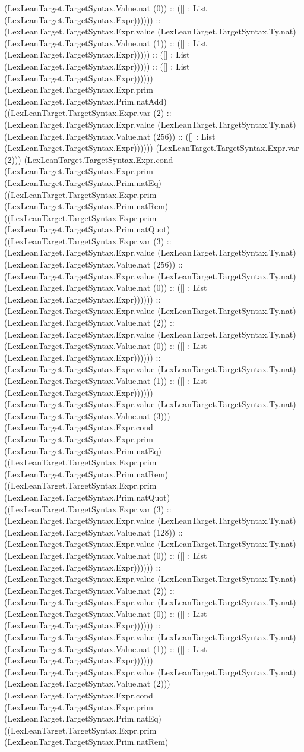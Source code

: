 \documentclass[11pt]{article}
\begin{document}
(LexLeanTarget.TargetSyntax.Value.nat (0)) :: ([] : List (LexLeanTarget.TargetSyntax.Expr)))))) :: (LexLeanTarget.TargetSyntax.Expr.value (LexLeanTarget.TargetSyntax.Ty.nat) (LexLeanTarget.TargetSyntax.Value.nat (1)) :: ([] : List (LexLeanTarget.TargetSyntax.Expr))))) :: ([] : List (LexLeanTarget.TargetSyntax.Expr))))) :: ([] : List (LexLeanTarget.TargetSyntax.Expr)))))) (LexLeanTarget.TargetSyntax.Expr.prim (LexLeanTarget.TargetSyntax.Prim.natAdd) ((LexLeanTarget.TargetSyntax.Expr.var (2) :: (LexLeanTarget.TargetSyntax.Expr.value (LexLeanTarget.TargetSyntax.Ty.nat) (LexLeanTarget.TargetSyntax.Value.nat (256)) :: ([] : List (LexLeanTarget.TargetSyntax.Expr)))))) (LexLeanTarget.TargetSyntax.Expr.var (2))) (LexLeanTarget.TargetSyntax.Expr.cond (LexLeanTarget.TargetSyntax.Expr.prim (LexLeanTarget.TargetSyntax.Prim.natEq) ((LexLeanTarget.TargetSyntax.Expr.prim (LexLeanTarget.TargetSyntax.Prim.natRem) ((LexLeanTarget.TargetSyntax.Expr.prim (LexLeanTarget.TargetSyntax.Prim.natQuot) ((LexLeanTarget.TargetSyntax.Expr.var (3) :: (LexLeanTarget.TargetSyntax.Expr.value (LexLeanTarget.TargetSyntax.Ty.nat) (LexLeanTarget.TargetSyntax.Value.nat (256)) :: (LexLeanTarget.TargetSyntax.Expr.value (LexLeanTarget.TargetSyntax.Ty.nat) (LexLeanTarget.TargetSyntax.Value.nat (0)) :: ([] : List (LexLeanTarget.TargetSyntax.Expr)))))) :: (LexLeanTarget.TargetSyntax.Expr.value (LexLeanTarget.TargetSyntax.Ty.nat) (LexLeanTarget.TargetSyntax.Value.nat (2)) :: (LexLeanTarget.TargetSyntax.Expr.value (LexLeanTarget.TargetSyntax.Ty.nat) (LexLeanTarget.TargetSyntax.Value.nat (0)) :: ([] : List (LexLeanTarget.TargetSyntax.Expr)))))) :: (LexLeanTarget.TargetSyntax.Expr.value (LexLeanTarget.TargetSyntax.Ty.nat) (LexLeanTarget.TargetSyntax.Value.nat (1)) :: ([] : List (LexLeanTarget.TargetSyntax.Expr)))))) (LexLeanTarget.TargetSyntax.Expr.value (LexLeanTarget.TargetSyntax.Ty.nat) (LexLeanTarget.TargetSyntax.Value.nat (3))) (LexLeanTarget.TargetSyntax.Expr.cond (LexLeanTarget.TargetSyntax.Expr.prim (LexLeanTarget.TargetSyntax.Prim.natEq) ((LexLeanTarget.TargetSyntax.Expr.prim (LexLeanTarget.TargetSyntax.Prim.natRem) ((LexLeanTarget.TargetSyntax.Expr.prim (LexLeanTarget.TargetSyntax.Prim.natQuot) ((LexLeanTarget.TargetSyntax.Expr.var (3) :: (LexLeanTarget.TargetSyntax.Expr.value (LexLeanTarget.TargetSyntax.Ty.nat) (LexLeanTarget.TargetSyntax.Value.nat (128)) :: (LexLeanTarget.TargetSyntax.Expr.value (LexLeanTarget.TargetSyntax.Ty.nat) (LexLeanTarget.TargetSyntax.Value.nat (0)) :: ([] : List (LexLeanTarget.TargetSyntax.Expr)))))) :: (LexLeanTarget.TargetSyntax.Expr.value (LexLeanTarget.TargetSyntax.Ty.nat) (LexLeanTarget.TargetSyntax.Value.nat (2)) :: (LexLeanTarget.TargetSyntax.Expr.value (LexLeanTarget.TargetSyntax.Ty.nat) (LexLeanTarget.TargetSyntax.Value.nat (0)) :: ([] : List (LexLeanTarget.TargetSyntax.Expr)))))) :: (LexLeanTarget.TargetSyntax.Expr.value (LexLeanTarget.TargetSyntax.Ty.nat) (LexLeanTarget.TargetSyntax.Value.nat (1)) :: ([] : List (LexLeanTarget.TargetSyntax.Expr)))))) (LexLeanTarget.TargetSyntax.Expr.value (LexLeanTarget.TargetSyntax.Ty.nat) (LexLeanTarget.TargetSyntax.Value.nat (2))) (LexLeanTarget.TargetSyntax.Expr.cond (LexLeanTarget.TargetSyntax.Expr.prim (LexLeanTarget.TargetSyntax.Prim.natEq) ((LexLeanTarget.TargetSyntax.Expr.prim (LexLeanTarget.TargetSyntax.Prim.natRem) 
\end{document}
